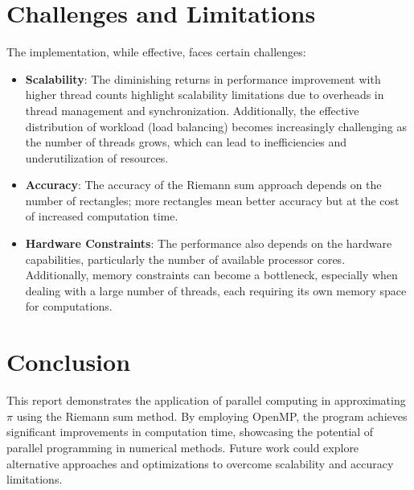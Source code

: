 \documentclass[11pt]{article}
\begin{document}
    \section{Challenges and Limitations}
The implementation, while effective, faces certain challenges:
\begin{itemize}
\item \textbf{Scalability}: The diminishing returns in performance improvement with higher thread counts highlight scalability limitations due to overheads in thread management and synchronization. Additionally, the effective distribution of workload (load balancing) becomes increasingly challenging as the number of threads grows, which can lead to inefficiencies and underutilization of resources.
\item \textbf{Accuracy}: The accuracy of the Riemann sum approach depends on the number of rectangles; more rectangles mean better accuracy but at the cost of increased computation time.
\item \textbf{Hardware Constraints}: The performance also depends on the hardware capabilities, particularly the number of available processor cores. Additionally, memory constraints can become a bottleneck, especially when dealing with a large number of threads, each requiring its own memory space for computations.
\end{itemize}

    \section{Conclusion}
    This report demonstrates the application of parallel computing in approximating $\pi$ using the Riemann sum method. By employing OpenMP, the program achieves significant improvements in computation time, showcasing the potential of parallel programming in numerical methods. Future work could explore alternative approaches and optimizations to overcome scalability and accuracy limitations.
\end{document}
